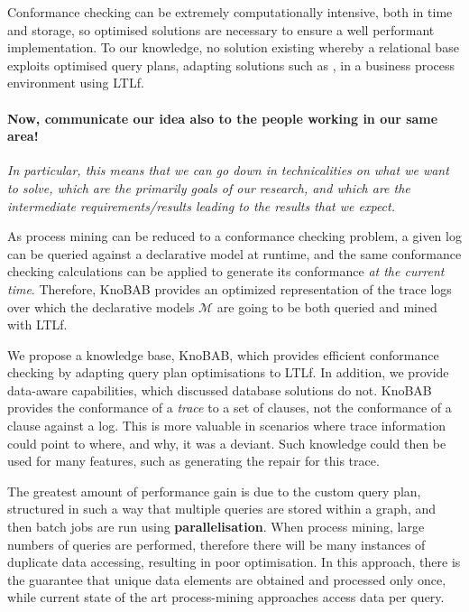 Conformance checking can be extremely computationally intensive, both in time and storage, so optimised solutions are necessary to ensure a well performant implementation. To our knowledge, no solution existing whereby a relational base exploits optimised query plans, adapting solutions such as \cite{BellatrecheKB21}, in a business process environment using LTLf.
\medskip


\paragraph*{Now, communicate our idea also to the people working in our same area!} \textit{In particular, this means that we can go down in technicalities on what we want to solve, which are the primarily goals of our research, and which are the intermediate requirements/results leading to the results that we expect.} 

As process mining can be reduced to a conformance checking problem, a given log can be queried against a declarative model at runtime, and the same conformance checking calculations can be applied to generate its conformance \emph{at the current time}. Therefore, KnoBAB provides an optimized representation of the trace logs over which the declarative models $\mathcal{M}$ are going to be both queried and mined with LTLf.

We propose a knowledge base, KnoBAB, which provides efficient conformance checking by adapting query plan optimisations \cite{BellatrecheKB21} to LTLf. In addition, we provide data-aware capabilities, which discussed database solutions do not. KnoBAB provides the conformance of a \emph{trace} to a set of clauses, not the conformance of a clause against a log. This is more valuable in scenarios where trace information could point to where, and why, it was a deviant. Such knowledge could then be used for many features, such as generating the repair for this trace.
\medskip
 

The greatest amount of performance gain is due to the custom query plan, structured in such a way that multiple queries are stored within a graph, and then batch jobs are run using \textbf{parallelisation}. When process mining, large numbers of queries are performed, therefore there will be many instances of duplicate data accessing, resulting in poor optimisation. In this approach, there is the guarantee that unique data elements are obtained and processed only once, while current state of the art process-mining approaches access data per query. 
